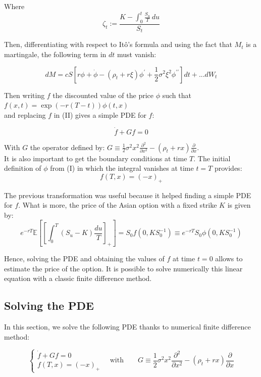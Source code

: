 \documentclass{article}
\begin{document}
Where
\[
	\zeta_{t} := \frac{K-\int_{0}^{t} \frac{S_{u}}{T}\,du}{S_{t}}
\]

Then, differentiating with respect to It\^o's formula and using the fact that $M_{t}$ is a martingale,
the following term in $dt$ must vanish:

\begin{equation}
	dM={c}{{S\left[r\phi+\dot{\phi}-\left(\rho_{t}+r\xi\right)\phi^{\prime}
	+\frac{1}{2}\sigma^{2}\xi^{2}\phi^{\prime\prime}\right]}}dt +...dW_t
	\tag{II}
\end{equation}

Then writing $f$ the discounted value of the price $\phi$ such that $f(x,t)=\exp(-r(T-t))\phi(t, x)$ \\
and replacing $f$ in (II) gives a simple PDE for $f$:

\begin{equation}
	\dot{f} + Gf=0
	\tag{PDE}
\end{equation}

With $G$ the operator defined by:
$G\equiv\frac{1}{2}\sigma^{2}x^{2}\frac{\partial^{2}}{\partial x^{2}}-(\rho_{t}+r x)\frac{\partial}{\partial x}$.
\\

It is also important to get the boundary conditions at time $T$. The initial definition of $\phi$ from (I)
in which the integral vanishes at time $t=T$ provides:
\[
	f(T,x)=(-x)_{+} 
\]

The previous transformation was useful because it helped finding a simple PDE for $f$.
What is more, the price of the Asian option with a fixed strike $K$ is given by:
\[
 	e^{-r T} \mathbb E \left[ \left[ \int_{0}^{T} \left( S_{u}-K \right) \frac{du}{T} \right]_{+} \right]
	=S_{0} f \left( 0, K S_{0}^{-1} \right) \equiv e^{-r T} S_{0} \phi \left( 0, K S_{0}^{-1} \right)
\]

Hence, solving the PDE and obtaining the values of $f$ at time $t=0$ allows to estimate the price of the option.
It is possible to solve numerically this linear equation with a classic finite difference method. 

\subsection{Solving the PDE}

In this section, we solve the following PDE thanks to numerical finite difference method:

\[
	\begin{cases}
		\dot{f} + Gf = 0 \\
		f(T,x)=(-x)_{+}
	\end{cases}
	\quad \text{with} \qquad
	G \equiv \frac{1}{2}\sigma^{2}x^{2}\frac{\partial^{2}}{\partial x^{2}}-(\rho_{t}+r x)\frac{\partial}{\partial x}
\]
\end{document}
